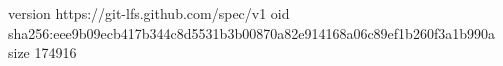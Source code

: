 version https://git-lfs.github.com/spec/v1
oid sha256:eee9b09ecb417b344c8d5531b3b00870a82e914168a06c89ef1b260f3a1b990a
size 174916
